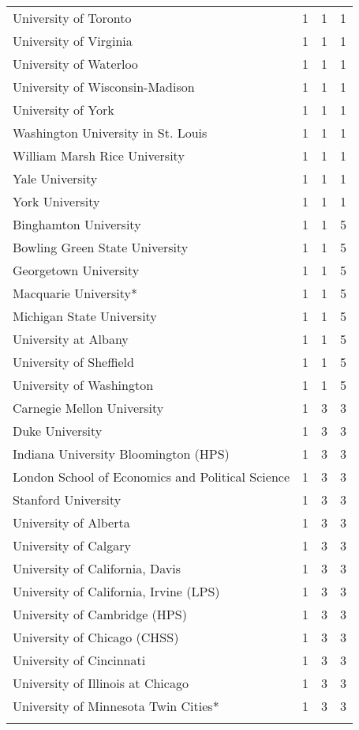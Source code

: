 \begin{longtable}[t]{llll}
University of Toronto & 1 & 1 & 1\\
\addlinespace
University of Virginia & 1 & 1 & 1\\
University of Waterloo & 1 & 1 & 1\\
University of Wisconsin-Madison & 1 & 1 & 1\\
University of York & 1 & 1 & 1\\
Washington University in St. Louis & 1 & 1 & 1\\
\addlinespace
William Marsh Rice University & 1 & 1 & 1\\
Yale University & 1 & 1 & 1\\
York University & 1 & 1 & 1\\
Binghamton University & 1 & 1 & 5\\
Bowling Green State University & 1 & 1 & 5\\
\addlinespace
Georgetown University & 1 & 1 & 5\\
Macquarie University* & 1 & 1 & 5\\
Michigan State University & 1 & 1 & 5\\
University at Albany & 1 & 1 & 5\\
University of Sheffield & 1 & 1 & 5\\
\addlinespace
University of Washington & 1 & 1 & 5\\
Carnegie Mellon University & 1 & 3 & 3\\
Duke University & 1 & 3 & 3\\
Indiana University Bloomington (HPS) & 1 & 3 & 3\\
London School of Economics and Political Science & 1 & 3 & 3\\
\addlinespace
Stanford University & 1 & 3 & 3\\
University of Alberta & 1 & 3 & 3\\
University of Calgary & 1 & 3 & 3\\
University of California, Davis & 1 & 3 & 3\\
University of California, Irvine (LPS) & 1 & 3 & 3\\
\addlinespace
University of Cambridge (HPS) & 1 & 3 & 3\\
University of Chicago (CHSS) & 1 & 3 & 3\\
University of Cincinnati & 1 & 3 & 3\\
University of Illinois at Chicago & 1 & 3 & 3\\
University of Minnesota Twin Cities* & 1 & 3 & 3\\
\addlinespace

\end{longtable}
